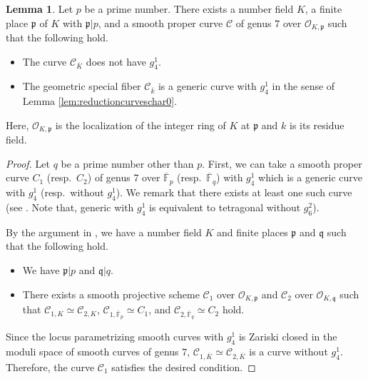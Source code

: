 \documentclass[autodetect-engine, a4paper]{amsart}
\theoremstyle{definition}
\newtheorem{lem}[thm]{Lemma}
\def\p{{\mathfrak p}}
\def\F{{\mathbb F}}
\def\cO{\mathcal{O}}
\begin{document}
\begin{lem}
\label{lem:reductioncurves}
Let $p$ be a prime number.
There exists a number field $K$, a finite place $\mathfrak{p}$ of $K$ with $\mathfrak{p} | p$, and a smooth proper curve $\mathcal{C}$ of genus $7$ over $\cO_{K,\p}$ such that the following hold.
\begin{itemize}
\item 
The curve $\mathcal{C}_{\overline{K}}$ does not have $g_4^1$.

\item 
The geometric special fiber $\mathcal{C}_{\overline{k}}$ is a generic curve with $g_4^1$ in the sense of Lemma \ref{lem:reductioncurveschar0}.
\end{itemize}
Here, $\cO_{K,\mathfrak{p}}$ is the localization of the integer ring of $K$ at $\mathfrak{p}$ and $k$ is its residue field.
\end{lem}

\begin{proof}
Let $q$ be a prime number other than $p$.
First, we can take a smooth proper curve $C_{1}$ (resp.\ $C_2$) of genus 7 over $\overline{\F}_{p}$ (resp.\  $\overline{\F}_{q}$) with $g_4^1$ which is a generic curve with $g_4^1$  (resp.\ without $g_4^1$).
We remark that there exists at least one such curve (see \cite[Table 1]{Mukaicurve}. Note that, generic with $g_4^1$ is equivalent to tetragonal without $g_6^2$).

By the argument in \cite[Example 0.9]{MBSkolem}, we have a number field $K$ and finite places $\mathfrak{p}$ and $\mathfrak{q}$ such that the following hold.
\begin{itemize}
\item 
We have $\mathfrak{p} | p$ and $\mathfrak{q} | q$.
\item 
There exists a smooth projective scheme $\mathcal{C}_{1}$ over $\cO_{K, \p}$ and $\mathcal{C}_{2}$ over $\cO_{K,\mathfrak{q}}$ such that $\mathcal{C}_{1,K} \simeq \mathcal{C}_{2,K}$, $\mathcal{C}_{1, \overline{\F}_{p}} \simeq C_{1}$, and $\mathcal{C}_{2, \overline{\F}_{q}} \simeq C_{2}$ hold.
\end{itemize}
Since the locus parametrizing smooth curves with $g_4^1$ is Zariski closed in the moduli space of smooth curves of genus $7$, $\mathcal{C}_{1,\overline{K}} \simeq \mathcal{C}_{2,\overline{K}}$ is a curve without $g_4^1$.
Therefore, the curve $\mathcal{C}_{1}$ satisfies the desired condition.
\end{proof}
\end{document}
